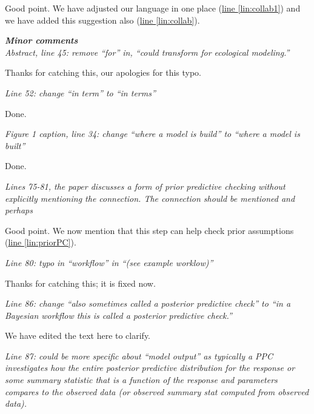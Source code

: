 \documentclass[11pt,letter]{article}
\begin{document}
Good point. We have adjusted our language in one place (\href{file:forecastflows_r1\#lintarget:collab1}{line \ref*{lin:collab1}}) and we have added this suggestion also (\href{file:forecastflows_r1\#lintarget:collab}{line \ref*{lin:collab}}).

\begin{mybox}
\emph{\textbf{Minor comments}\\
Abstract, line 45: remove “for” in, “could transform for ecological modeling.”}
\end{mybox}

Thanks for catching this, our apologies for this typo.

\begin{mybox}
\emph{Line 52: change “in term” to “in terms”}
\end{mybox}

Done.

\begin{mybox}
\emph{Figure 1 caption, line 34: change “where a model is build” to “where a model is built”}
\end{mybox}

Done.

\begin{mybox}
\emph{Lines 75-81, the paper discusses a form of prior predictive checking without explicitly mentioning the connection. The connection should be mentioned and perhaps}
\end{mybox}

Good point. We now mention that this step can help check prior assumptions (\href{file:forecastflows_r1\#lintarget:priorPC}{line \ref*{lin:priorPC}}).

\begin{mybox}
\emph{Line 80: typo in “workflow” in “(see example worklow)”}
\end{mybox}

Thanks for catching this; it is fixed now. 

\begin{mybox}
\emph{Line 86: change “also sometimes called a posterior predictive check” to “in a Bayesian workflow this is called a posterior predictive check.”}
\end{mybox}

We have edited the text here to clarify. 

\begin{mybox}
\emph{Line 87: could be more specific about “model output” as typically a PPC investigates how the entire posterior predictive distribution for the response or some summary statistic that is a function of the response and parameters compares to the observed data (or observed summary stat computed from observed data).}
\end{mybox}
\end{document}
